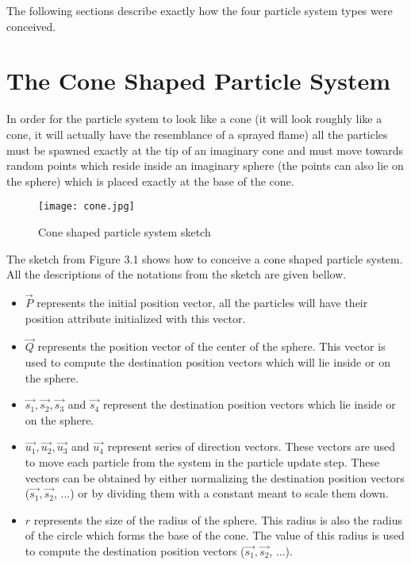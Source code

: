 The following sections describe exactly how the four particle system types were conceived.\\

\newpage
\section{The Cone Shaped Particle System}
In order for the particle system to look like a cone (it will look roughly like a cone, it will actually have the resemblance of a sprayed flame) all the particles must be spawned exactly at the tip of an imaginary cone and must move towards random points which reside inside an imaginary sphere (the points can also lie on the sphere) which is placed exactly at the base of the cone.\\

\begin{figure}[h]
	\caption{Cone shaped particle system sketch}
	\centering
	\texttt{[image: cone.jpg]}
\end{figure}

The sketch from Figure 3.1 shows how to conceive a cone shaped particle system. All the descriptions of the notations from the sketch are given bellow.\\

\begin{itemize}
	\item $\vec{P}$ represents the initial position vector, all the particles will have their position attribute initialized with this vector.
	
	\item $\vec{Q}$ represents the position vector of the center of the sphere. This vector is used to compute the destination position vectors which will lie inside or on the sphere.
	
	\item $\vec{s_1}, \vec{s_2}, \vec{s_3}$ and $\vec{s_4}$ represent the destination position vectors which lie inside or on the sphere.
	
	\item $\vec{u_1}, \vec{u_2}, \vec{u_3}$ and $\vec{u_4}$ represent series of direction vectors. These vectors are used to move each particle from the system in the particle update step. These vectors can be obtained by either normalizing the destination position vectors ($\vec{s_1}, \vec{s_2}$, ...) or by dividing them with a constant meant to scale them down.
	
	\item $r$ represents the size of the radius of the sphere. This radius is also the radius of the circle which forms the base of the cone. The value of this radius is used to compute the destination position vectors ($\vec{s_1}, \vec{s_2}$, ...).
\end{itemize}

